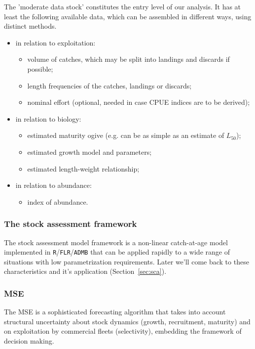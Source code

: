 \documentclass[a4paper,english,10pt]{article}\usepackage[]{graphicx}\usepackage[]{color}
\newcommand{\pkg}[1]{{\texttt{#1}}}
\begin{document}
The 'moderate data stock' constitutes the entry level of our analysis. It has at least the following available data, which can be assembled in different ways, using distinct methods.
 
\begin{itemize}
	\item in relation to exploitation:
	\begin{itemize}
		\item volume of catches, which may be split into landings and discards if possible;
		\item length frequencies of the catches, landings or discards;
		\item nominal effort (optional, needed in case CPUE indices are to be derived);
	\end{itemize}
	\item in relation to biology:
	\begin{itemize}
		\item estimated maturity ogive (e.g. can be as simple as an estimate of $L_{50}$);
		\item estimated growth model and parameters;
		\item estimated length-weight relationship;
	\end{itemize}
	\item in relation to abundance:
	\begin{itemize}
		\item index of abundance.
	\end{itemize}	
\end{itemize}

\subsubsection{The stock assessment framework}

The stock assessment model framework is a non-linear catch-at-age model implemented in \pkg{R}/\pkg{FLR}/\pkg{ADMB} that can be applied rapidly to a wide range of situations with low parametrization requirements. Later we'll come back to these characteristics and it's application (Section~\ref{sec:sca}).

\subsubsection{MSE}

The MSE is a sophisticated forecasting algorithm that takes into account structural uncertainty about stock dynamics (growth, recruitment, maturity) and on exploitation by commercial fleets (selectivity), embedding the framework of decision making. 
\end{document}
